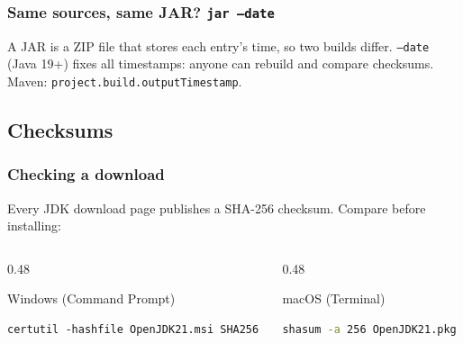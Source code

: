 \documentclass[aspectratio=169,10pt,compress]{beamer}
\begin{document}
\begin{frame}[t,fragile] \frametitle{Same sources, same JAR? \texttt{jar --date}}

  \vspace{0.1em}
  \small
  A JAR is a ZIP file that stores each entry's time, so two builds differ. \texttt{--date} (Java 19+) fixes all
  timestamps: anyone can rebuild and compare checksums. Maven: \texttt{project.build.outputTimestamp}.
\end{frame}

\subsection[Checksums]{Checksums}




\begin{frame}[t,fragile] \frametitle{Checking a download}
  \vspace{0.2em}
  Every JDK download page publishes a SHA-256 checksum. Compare before installing:
  \begin{columns}[T]
    \begin{column}{0.48\textwidth}
      \begin{block}{Windows (Command Prompt)}


\begin{lstlisting}[style=codesnippet, language={}, basicstyle=\ttfamily\scriptsize]
certutil -hashfile OpenJDK21.msi SHA256
\end{lstlisting}


      \end{block}
    \end{column}
    \begin{column}{0.48\textwidth}
      \begin{block}{macOS (Terminal)}


\begin{lstlisting}[style=codesnippet, language=bash, basicstyle=\ttfamily\scriptsize]
shasum -a 256 OpenJDK21.pkg
\end{lstlisting}


      \end{block}
    \end{column}
  \end{columns}
\end{frame}
\end{document}
